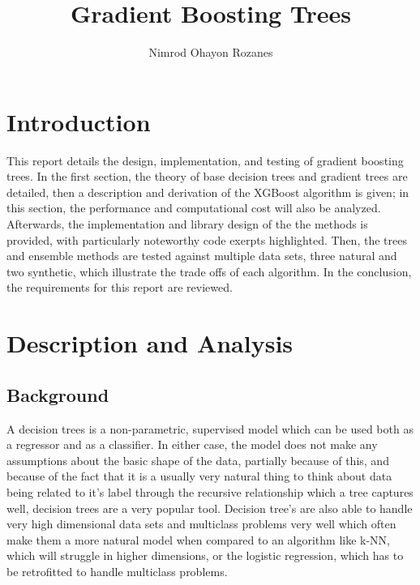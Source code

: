 \documentclass[a4paper, 11pt]{article}
\title{Gradient Boosting Trees}
\author{Nimrod Ohayon Rozanes}
\begin{document}
\maketitle
\break
\tableofcontents
\break
\section{Introduction}

This report details the design, implementation, and testing of
gradient boosting trees. In the first section, the theory of base decision
trees and gradient trees are detailed, then a description and
derivation of the XGBoost algorithm is given; in this section, the
performance and computational cost will also be analyzed. Afterwards, the
implementation and library design of the the methods is provided,
with particularly noteworthy code exerpts highlighted. Then, the
trees and ensemble methods are tested against multiple data sets,
three natural and two synthetic, which illustrate the trade offs of
each algorithm. In the conclusion, the requirements for this report
are reviewed.

\section{Description and Analysis}
\subsection{Background}

A decision trees is a non-parametric, supervised model which can be
used both as a regressor and as a classifier. In either case, the
model does not make any assumptions about the basic shape of the
data, partially because of this, and because of the fact that it is a
usually very natural thing to think about data being related to it's
label through the recursive relationship which a tree captures well,
decision trees are a very popular tool. Decision tree's are also
able to handle very high dimensional data sets and multiclass
problems very well which often make them a more natural model when
compared to an algorithm like k-NN, which will struggle in higher
dimensions, or the logistic regression, which has to be retrofitted
to handle multiclass problems.
\end{document}
